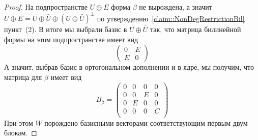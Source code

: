 \begin{proof}
На подпространстве $U\oplus E$ форма $\beta$ не вырождена, а значит $U\oplus E = U \oplus \bar U \oplus(U \oplus \bar U)^\bot$ по утверждению~\ref{claim::NonDegRestrictionBil} пункт~(2).
В итоге мы выбрали базис в $U\oplus \bar U$ так, что матрица билинейной формы на этом подпространстве имеет вид
\[
\begin{pmatrix}
{0}&{E}\\
{E}&{0}
\end{pmatrix}
\]
А значит, выбрав базис в ортогональном дополнении и в ядре, мы получим, что матрица для $\beta$ имеет вид
\[
B_\beta = 
\begin{pmatrix}
{0}&{0}&{0}&{0}\\
{0}&{0}&{E}&{0}\\
{0}&{E}&{0}&{0}\\
{0}&{0}&{0}&{C}\\
\end{pmatrix}
\]
При этом $W$ порождено базисными векторами соответствующим первым двум блокам.


\end{proof}

